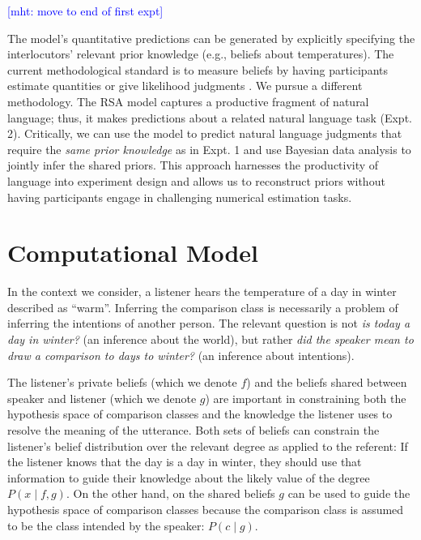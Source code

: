 \documentclass[doc]{apa6}
\begin{document}

\textcolor{Blue}{[mht: move to end of first expt]}

The model's quantitative predictions can be generated by explicitly
specifying the interlocutors' relevant prior knowledge (e.g., beliefs
about temperatures). The current methodological standard is to measure
beliefs by having participants estimate quantities or give likelihood
judgments \cite{Franke2016}. We pursue a different methodology. The
RSA model captures a productive fragment of natural language; thus, it
makes predictions about a related natural language task (Expt. 2).
Critically, we can use the model to predict natural language judgments
that require the \emph{same prior knowledge} as in Expt. 1 and use
Bayesian data analysis to jointly infer the shared priors. This approach
harnesses the productivity of language into experiment design and allows
us to reconstruct priors without having participants engage in
challenging numerical estimation tasks.

\section{Computational Model}

In the context we consider, a listener hears the temperature of a day in winter described as ``warm''. 
Inferring the comparison class is necessarily a problem of inferring the intentions of another person.
The relevant question is not \emph{is today a day in winter?} (an inference about the world), but rather \emph{did the speaker mean to draw a comparison to days to winter?} (an inference about intentions).

The listener's private beliefs (which we denote $f$) and the beliefs shared between speaker and listener (which we denote $g$) are important in constraining both the hypothesis space of comparison classes and the knowledge the listener uses to resolve the meaning of the utterance.
Both sets of beliefs can constrain the listener's belief distribution over the relevant degree as applied to the referent: If the listener knows that the day is a day in winter, they should use that information to guide their knowledge about the likely value of the degree $P(x \mid f, g)$.
On the other hand, on the shared beliefs $g$ can be used to guide the hypothesis space of comparison classes because the comparison class is assumed to be the class intended by the speaker: $P(c \mid g)$.
\end{document}
